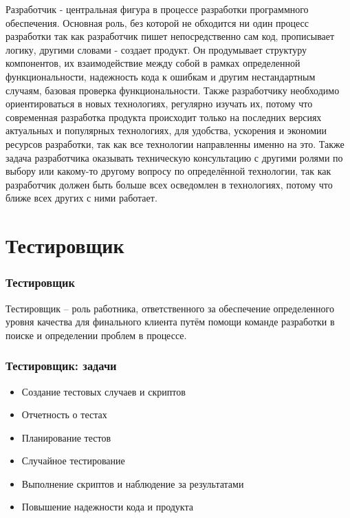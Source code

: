 \documentclass{../industrial-development}
\begin{document}
	\lecturenotes
		Разработчик - центральная фигура в процессе разработки программного обеспечения. Основная роль, без которой не обходится ни один процесс разработки так как разработчик пишет непосредственно сам код, прописывает логику, другими словами - создает продукт. Он продумывает структуру компонентов, их взаимодействие между собой в рамках определенной функциональности, надежность кода к ошибкам и другим нестандартным случаям, базовая проверка функциональности. Также разработчику необходимо ориентироваться в новых технологиях, регулярно изучать их, потому что современная разработка продукта происходит только на последних версиях актуальных и популярных технологиях, для удобства, ускорения и экономии ресурсов разработки, так как все технологии направленны именно на это.
		Также задача разработчика оказывать техническую консультацию с другими ролями по выбору или какому-то другому вопросу по определённой технологии, так как разработчик должен быть больше всех осведомлен в технологиях, потому что ближе всех других с ними работает.
	
	\section{Тестировщик }
	
	\begin{frame} \frametitle{Тестировщик}
		\begin{block}{}
			\alert {Тестировщик} – роль работника, ответственного за обеспечение определенного уровня качества для финального клиента путём помощи команде разработки в поиске и определении проблем в процессе.
		\end{block}
		
	\end{frame}
	
	\begin{frame} \frametitle{Тестировщик: задачи}
		\begin{itemize}
			\item Создание тестовых случаев и скриптов
			\item Отчетность о тестах
			\item Планирование тестов
			\item Случайное тестирование
			\item Выполнение скриптов и наблюдение за результатами 
			\item Повышение надежности кода и продукта
		\end{itemize}
	\end{frame}
	
\end{document}
